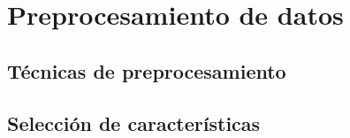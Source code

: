 \chapter{Preprocesamiento de datos}
\section{Técnicas de preprocesamiento}

\section{Selección de características}
